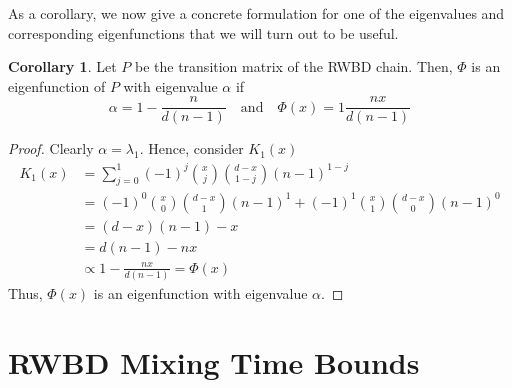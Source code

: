 \documentclass{article}
\theoremstyle{definition}
\theoremstyle{definition}
\theoremstyle{definition}
\theoremstyle{definition}
\newtheorem{corollary}{Corollary}
\theoremstyle{named}
\begin{document}
\noindent As a corollary, we now give a concrete formulation for one of the eigenvalues and corresponding eigenfunctions that we will turn out to be useful.
      \begin{corollary}
         \label{Wilson-eig}
         Let $P$ be the transition matrix of the RWBD chain. Then, $\Phi$ is an eigenfunction of $P$ with eigenvalue $\alpha$ if
         \[\alpha= 1 - \frac{n}{d(n-1)}\quad \text{and}\quad \Phi(x) = 1 \frac{nx}{d(n-1)}\]
         \begin{proof}
           Clearly $\alpha = \lambda_1$. Hence, consider $K_1(x)$
            \begin{align*}
            K_1(x) &= \sum_{j=0}^1 (-1)^j{x \choose j}{d-x \choose 1-j}(n-1)^{1-j}\\
            &= (-1)^0{x\choose 0}{d-x \choose 1}(n-1)^{1} + (-1)^1{x \choose 1}{d-x\choose 0}(n-1)^{0}\\
            &= (d-x)(n-1) -x\\
            &= d(n-1) -nx\\
            &\propto 1 -\frac{nx}{d(n-1)} = \Phi(x)
            \end{align*}
            Thus, $\Phi(x)$ is an eigenfunction with eigenvalue $\alpha$.
         \end{proof}
      \end{corollary}
      



\section{RWBD Mixing Time Bounds}
\end{document}
